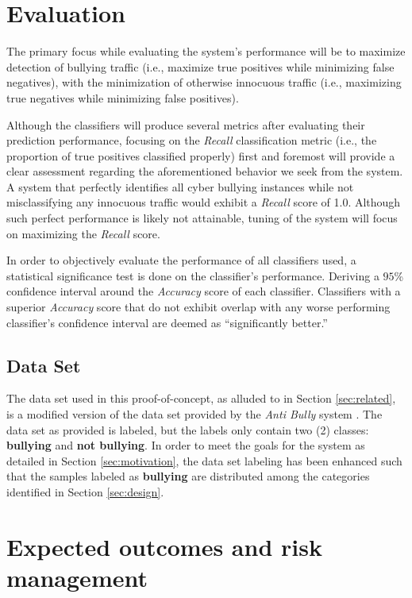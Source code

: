 \documentclass[conference]{sig-alternate-05-2015}
\begin{document}
\section{Evaluation}\label{sec:evaluation}

The primary focus while evaluating the system's performance will be to maximize
detection of bullying traffic (i.e., maximize true positives while minimizing
false negatives), with the minimization of otherwise innocuous traffic (i.e.,
maximizing true negatives while minimizing false positives).

Although the classifiers will produce several metrics after evaluating their
prediction performance, focusing on the \textit{Recall} classification metric
(i.e., the proportion of true positives classified properly) first and foremost
will provide a clear assessment regarding the aforementioned behavior we seek
from the system. A system that perfectly identifies all cyber bullying instances
while not misclassifying any innocuous traffic would exhibit a \textit{Recall}
score of 1.0. Although such perfect performance is likely not attainable, tuning
of the system will focus on maximizing the \textit{Recall} score.

In order to objectively evaluate the performance of all classifiers used, a
statistical significance test is done on the classifier's performance. Deriving
a $95$\% confidence interval around the \textit{Accuracy} score of each
classifier. Classifiers with a superior \textit{Accuracy} score that do not
exhibit overlap with any worse performing classifier's confidence interval are
deemed as ``significantly better.''

\subsection{Data Set}\label{sec:dataset}
The data set used in this proof-of-concept, as alluded to in Section
\ref{sec:related}, is a modified version of the data set provided by the
\textit{Anti Bully} system \cite{Li2016}. The data set as provided is labeled,
but the labels only contain two (2) classes: \textbf{bullying} and
\textbf{not bullying}. In order to meet the goals for the system as detailed in
Section \ref{sec:motivation}, the data set labeling has been
enhanced such that the samples labeled as \textbf{bullying} are distributed
among the categories identified in Section \ref{sec:design}.

\section{Expected outcomes and risk management}\label{sec:expectations}
\end{document}
